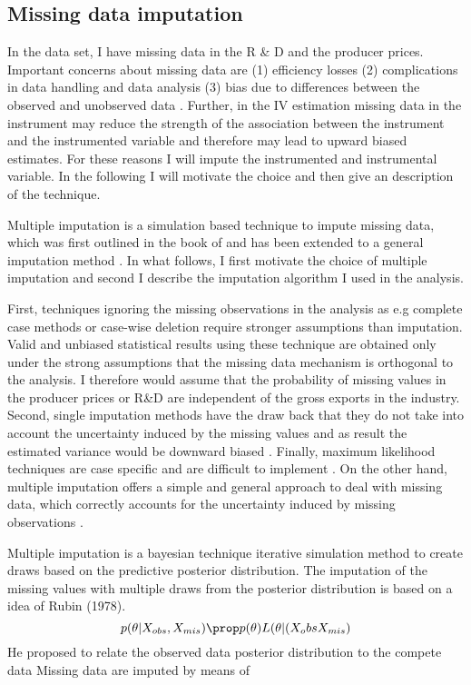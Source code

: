 \subsection{Missing data imputation}
 In the data set, I have missing data in the R \& D and the producer prices. Important concerns about missing data are (1) efficiency losses (2) complications in data handling and data analysis (3) bias due to differences between the observed and unobserved data \textcite{schafer1998multiple}. Further, in the IV estimation missing data in the instrument may reduce the strength of the association between the instrument and the instrumented variable and therefore may lead to upward biased estimates. For these reasons I will impute the instrumented and instrumental variable. In the following I will  motivate the choice and then give an description of the technique.  \par
Multiple imputation is a simulation based technique to impute missing data, which was first outlined in the book of \textcite{Rubin1987} and has been extended to a general imputation method \parencite{schafer1998multiple}.
In what follows, I first motivate the choice of multiple imputation and second I describe the imputation algorithm I used in the analysis. \par
First, techniques  ignoring the missing observations in the analysis as e.g complete case methods or case-wise deletion require stronger assumptions than imputation. Valid and unbiased statistical results using these technique  are obtained only under the strong assumptions that the missing data mechanism is orthogonal to the analysis.
I therefore would assume that the probability of  missing values in the producer prices or R\&D are independent of the gross exports in the industry.
Second, single imputation methods have the draw back that they do not take into account the uncertainty induced by the missing values and as result the estimated variance would be downward biased \parencite{Wooldridge} .
Finally, maximum likelihood techniques are case specific and are difficult to implement \parencite{schafer1998multiple}.
On the other hand,  multiple imputation offers a  simple and general approach to deal with missing data, which correctly accounts for the uncertainty induced by missing observations \parencite{schafer1998multiple}. \par
Multiple imputation is a bayesian technique iterative simulation method to create draws based on  the predictive posterior distribution. The imputation of the missing values with multiple draws from the posterior distribution is based on a idea of Rubin (1978). \[ p(\theta| X_{obs}, X_{mis}) \prop p(\theta) L(\theta | (  X_obs X_{mis} ) \] He proposed to relate the observed data posterior distribution to the compete data  Missing data are imputed by means of

